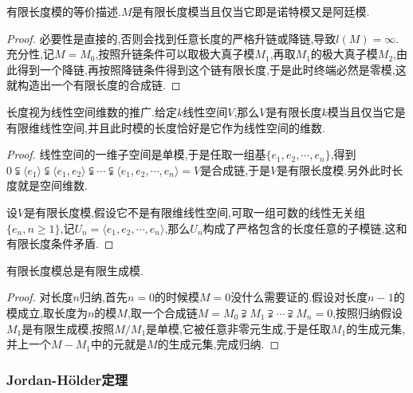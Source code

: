 有限长度模的等价描述.$M$是有限长度模当且仅当它即是诺特模又是阿廷模.
\begin{proof}
	
必要性是直接的,否则会找到任意长度的严格升链或降链,导致$l(M)=\infty$.充分性,记$M=M_0$,按照升链条件可以取极大真子模$M_1$,再取$M_1$的极大真子模$M_2$,由此得到一个降链,再按照降链条件得到这个链有限长度,于是此时终端必然是零模,这就构造出一个有限长度的合成链.
\end{proof}

长度视为线性空间维数的推广.给定$k$线性空间$V$,那么$V$是有限长度$k$模当且仅当它是有限维线性空间,并且此时模的长度恰好是它作为线性空间的维数.
\begin{proof}
	
	线性空间的一维子空间是单模,于是任取一组基$\{e_1,e_2,\cdots,e_n\}$,得到$0\subsetneqq\langle e_1\rangle\subsetneqq\langle e_1,e_2\rangle\subsetneqq\cdots\subsetneqq \langle e_1,e_2,\cdots,e_n\rangle=V$是合成链,于是$V$是有限长度模.另外此时长度就是空间维数.
	
	设$V$是有限长度模,假设它不是有限维线性空间,可取一组可数的线性无关组$\{e_n,n\ge1\}$,记$U_n=\langle e_1,e_2,\cdots,e_n\rangle$,那么$U_n$构成了严格包含的长度任意的子模链,这和有限长度条件矛盾.
\end{proof}

有限长度模总是有限生成模.
\begin{proof}
	
	对长度$n$归纳,首先$n=0$的时候模$M=0$没什么需要证的.假设对长度$n-1$的模成立,取长度为$n$的模$M$,取一个合成链$M=M_0\supsetneqq M_1\supsetneqq\cdots\supsetneqq M_n=0$,按照归纳假设$M_1$是有限生成模,按照$M/M_1$是单模,它被任意非零元生成,于是任取$M_1$的生成元集,并上一个$M-M_1$中的元就是$M$的生成元集,完成归纳.
\end{proof}
\subsubsection{Jordan-H\"older定理}

